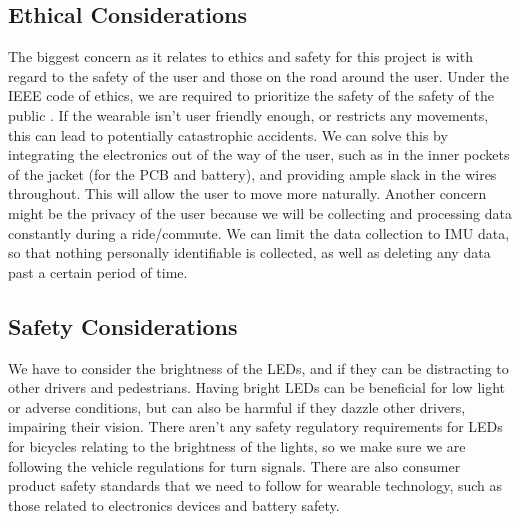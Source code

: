 \documentclass[12pt]{article}
\begin{document}
\subsection{Ethical Considerations}
The biggest concern as it relates to ethics and safety for 
this project is with regard to the safety of the user and 
those on the road around the user. Under the IEEE code of 
ethics, we are required to prioritize the safety of the 
safety of the public \cite{IEEEethics2024}. If the wearable isn’t user
friendly enough, or restricts any movements, this can lead 
to potentially catastrophic accidents. We can solve this by 
integrating the electronics out of the way of the user, 
such as in the inner pockets of the jacket (for the PCB 
and battery), and providing ample slack in the wires 
throughout. This will allow the user to move more naturally.
Another concern might be the privacy of the user \cite{IEEEethics2024}
because we will be collecting and processing data constantly 
during a ride/commute. We can limit the data collection to 
IMU data, so that nothing personally identifiable is
collected, as well as deleting any data past a certain 
period of time. 




\subsection{Safety Considerations}
We have to consider the brightness of the LEDs, and if they can be distracting to other drivers and pedestrians. Having bright LEDs can be beneficial for low light or adverse conditions, but can also be harmful if they dazzle other drivers, impairing their vision. There aren’t any safety regulatory requirements for LEDs for bicycles relating to the brightness of the lights, so we make sure we are following the vehicle regulations for turn signals. \cite{CFR571_108} There are also consumer product safety standards that we need to follow for wearable technology, such as those related to electronics devices and battery safety.


\newpage

\end{document}
